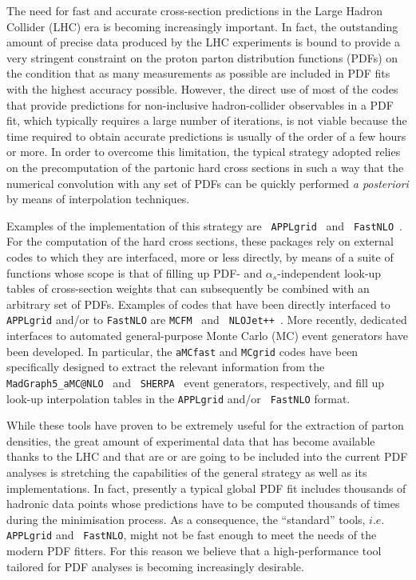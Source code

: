 \documentclass[preprint,12pt]{elsarticle}
\begin{document}
The need for fast and accurate cross-section predictions in the Large
Hadron Collider (LHC) era is becoming increasingly important. In fact,
the outstanding amount of precise data produced by the LHC experiments
is bound to provide a very stringent constraint on the proton parton
distribution functions (PDFs) on the condition that as many
measurements as possible are included in PDF fits with the highest
accuracy possible. However, the direct use of most of the codes that
provide predictions for non-inclusive hadron-collider observables in a
PDF fit, which typically requires a large number of iterations, is not
viable because the time required to obtain accurate predictions is
usually of the order of a few hours or more. In order to overcome this
limitation, the typical strategy adopted relies on the precomputation
of the partonic hard cross sections in such a way that the numerical
convolution with any set of PDFs can be quickly performed {\it a
  posteriori} by means of interpolation techniques.

Examples of the implementation of this strategy are {\tt
  APPLgrid}~\cite{Carli:2010rw} and {\tt
  FastNLO}~\cite{Wobisch:2011ij}. For the computation of the hard
cross sections, these packages rely on external codes to which they
are interfaced, more or less directly, by means of a suite of
functions whose scope is that of filling up PDF- and
$\alpha_s$-independent look-up tables of cross-section weights that can
subsequently be combined with an arbitrary set of PDFs. Examples of
codes that have been directly interfaced to {\tt APPLgrid} and/or to
{\tt FastNLO} are {\tt MCFM}~\cite{Campbell:2010ff} and {\tt
  NLOJet++}~\cite{Nagy:2003tz}. More recently, dedicated interfaces to
automated general-purpose Monte Carlo (MC) event generators have been
developed. In particular, the {\tt aMCfast} and {\tt MCgrid} codes
have been specifically designed to extract the relevant information
from the {\tt MadGraph5\_aMC@NLO}~\cite{Alwall:2014hca} and {\tt
  SHERPA}~\cite{Gleisberg:2008ta} event generators, respectively, and
fill up look-up interpolation tables in the {\tt APPLgrid} and/or {\tt
  FastNLO} format.

While these tools have proven to be extremely useful for the
extraction of parton densities, the great amount of experimental data
that has become available thanks to the LHC and that are or are going
to be included into the current PDF analyses is stretching the
capabilities of the general strategy as well as its
implementations. In fact, presently a typical global PDF fit includes
thousands of hadronic data points whose predictions have to be
computed thousands of times during the minimisation process. As a
consequence, the ``standard'' tools, $i.e.$ {\tt APPLgrid} and {\tt
  FastNLO}, might not be fast enough to meet the needs of the modern
PDF fitters. For this reason we believe that a high-performance tool
tailored for PDF analyses is becoming increasingly desirable.
\end{document}
